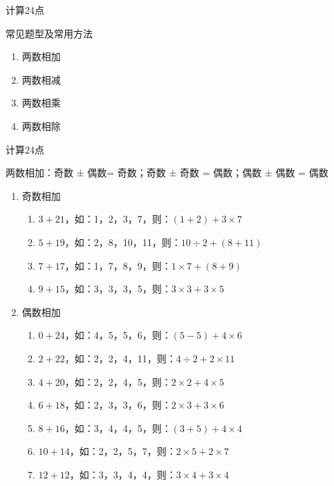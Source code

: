 \documentclass[aspectratio=169]{ctexbeamer} %
\date{\today}
\begin{document}
\begin{frame}[t]{计算24点}
\begin{spacing}{2.5}
\normalsize
\alert{常见题型及常用方法}
\begin{enumerate}[label={\arabic*.}]
\item 两数相加
\item 两数相减
\item 两数相乘
\item 两数相除
\end{enumerate}
\end{spacing}
\end{frame}

\begin{frame}[t]{计算24点}
\begin{spacing}{1.0}
\normalsize
\alert{两数相加：奇数 ± 偶数= 奇数；奇数 ± 奇数 = 偶数；偶数 ± 偶数 = 偶数}
\begin{enumerate}[label={\arabic*.}]
\item 奇数相加
	\begin{enumerate}[label={\Alph*.}]
	\item $3 + 21$，如：1，2，3，7，则：$(1 + 2) + 3 \times 7$
	\item $5 + 19$，如：2，8，10，11，则：$10 \div 2 + (8 + 11)$	
	\item $7 + 17$，如：1，7，8，9，则：$1 \times 7 + (8 + 9)$
	\item $9 + 15$，如：3，3，3，5，则：$3 \times 3 + 3 \times 5$
	\end{enumerate}
\item 偶数相加
	\begin{enumerate}[label={\Alph*.}]
	\item $0 + 24$，如：4，5，5，6，则：$(5 - 5) + 4 \times 6$	
	\item $2 + 22$，如：2，2，4，11，则：$4 \div 2 + 2 \times 11$	
	\item $4 + 20$，如：2，2，4，5，则：$2 \times 2 + 4 \times 5$		
	\item $6 + 18$，如：2，3，3，6，则：$2 \times 3 + 3 \times 6$
	\item $8 + 16$，如：3，4，4，5，则：$(3 + 5) + 4 \times 4$
	\item $10 + 14$，如：2，2，5，7，则：$2 \times 5 + 2 \times 7$
	\item $12 + 12$，如：3，3，4，4，则：$3 \times 4 + 3 \times 4$
	\end{enumerate}
\end{enumerate}
\end{spacing}
\end{frame}
\end{document}
